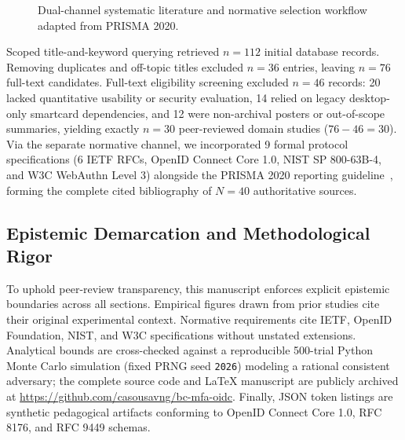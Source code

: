 \begin{figure}[!t]
{%
}
\caption{Dual-channel systematic literature and normative selection workflow adapted from PRISMA 2020.}
\label{fig:prisma_tp2}
\end{figure}

Scoped title-and-keyword querying retrieved $n = 112$ initial database records. Removing duplicates and off-topic titles excluded $n = 36$ entries, leaving $n = 76$ full-text candidates. Full-text eligibility screening excluded $n = 46$ records: 20 lacked quantitative usability or security evaluation, 14 relied on legacy desktop-only smartcard dependencies, and 12 were non-archival posters or out-of-scope summaries, yielding exactly $n = 30$ peer-reviewed domain studies ($76 - 46 = 30$). Via the separate normative channel, we incorporated 9 formal protocol specifications (6 IETF RFCs, OpenID Connect Core 1.0, NIST SP 800-63B-4, and W3C WebAuthn Level 3) alongside the PRISMA 2020 reporting guideline~\cite{page2021prisma}, forming the complete cited bibliography of $N = 40$ authoritative sources.

\subsection{Epistemic Demarcation and Methodological Rigor}
To uphold peer-review transparency, this manuscript enforces explicit epistemic boundaries across all sections. Empirical figures drawn from prior studies cite their original experimental context. Normative requirements cite IETF, OpenID Foundation, NIST, and W3C specifications without unstated extensions. Analytical bounds are cross-checked against a reproducible 500-trial Python Monte Carlo simulation (fixed PRNG seed \texttt{2026}) modeling a rational consistent adversary; the complete source code and LaTeX manuscript are publicly archived at \url{https://github.com/casousavng/bc-mfa-oidc}. Finally, JSON token listings are synthetic pedagogical artifacts conforming to OpenID Connect Core 1.0, RFC 8176, and RFC 9449 schemas.
